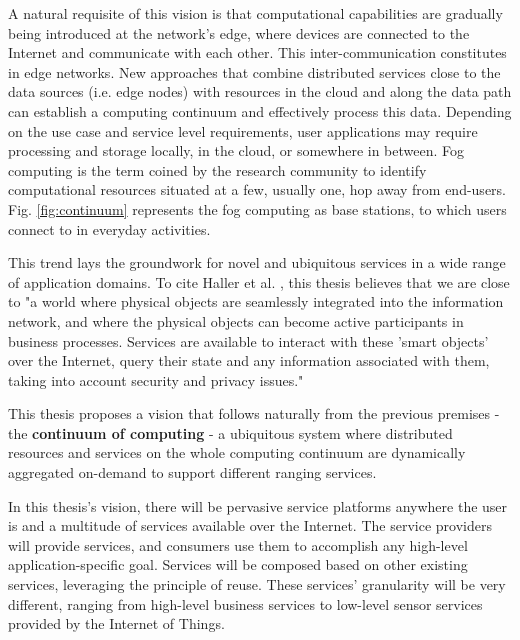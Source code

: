 A natural requisite of this vision is that computational capabilities are gradually being introduced at the network's edge, where devices are connected to the Internet and communicate with each other. This inter-communication constitutes in edge networks. New approaches that combine distributed services close to the data sources (i.e. edge nodes) with resources in the cloud and along the data path can establish a computing continuum and effectively process this data. Depending on the use case and service level requirements, user applications may require processing and storage locally, in the cloud, or somewhere in between. Fog computing \cite{fog-computing} is the term coined by the research community to identify computational resources situated at a few, usually one, hop away from end-users. Fig. \ref{fig:continuum} represents the fog computing as base stations, to which users connect to in everyday activities.

This trend lays the groundwork for novel and ubiquitous services in a wide range of application domains. To cite Haller et al. \cite{haller2008internet}, this thesis believes that we are close to "a world where physical objects are seamlessly integrated into the information network, and where the physical objects can become active participants in business processes. Services are available to interact with these 'smart objects' over the Internet, query their state and any information associated with them, taking into account security and privacy issues."

This thesis proposes a vision that follows naturally from the previous premises - the \textbf{continuum of computing} - a ubiquitous system where distributed resources and services on the whole computing continuum are dynamically aggregated on-demand to support different ranging services.

In this thesis's vision, there will be pervasive service platforms anywhere the user is and a multitude of services available over the Internet. The service providers will provide services, and consumers use them to accomplish any high-level application-specific goal. Services will be composed based on other existing services, leveraging the principle of reuse. These services' granularity will be very different, ranging from high-level business services to low-level sensor services provided by the Internet of Things.

